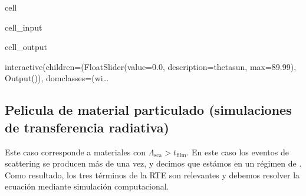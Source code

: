 \documentclass[letterpaper,10pt,english]{jupyterBook}
\begin{document}
\begin{sphinxuseclass}{cell}\begin{sphinxVerbatimInput}

\begin{sphinxuseclass}{cell_input}
\begin{sphinxVerbatim}[commandchars=\\\{\}]

 
     
\end{sphinxVerbatim}

\end{sphinxuseclass}\end{sphinxVerbatimInput}
\begin{sphinxVerbatimOutput}

\begin{sphinxuseclass}{cell_output}
\begin{sphinxVerbatim}[commandchars=\\\{\}]
interactive(children=(FloatSlider(value=0.0, description=\PYGZsq{}theta\PYGZus{}sun\PYGZsq{}, max=89.99), Output()), \PYGZus{}dom\PYGZus{}classes=(\PYGZsq{}wi…
\end{sphinxVerbatim}

\end{sphinxuseclass}\end{sphinxVerbatimOutput}

\end{sphinxuseclass}

\subsection{Pelicula de material particulado (simulaciones de transferencia radiativa)}
\label{\detokenize{5_TransporteRadiativo/5_TransporteRadiativo:pelicula-de-material-particulado-simulaciones-de-transferencia-radiativa}}
\sphinxAtStartPar
Este caso corresponde a materiales con \(\Lambda_\mathrm{sca} > t_\mathrm{film}\). En este caso los eventos de scattering se producen más de una vez, y decimos que estámos en un régimen de . Como resultado, los tres términos de la RTE son relevantes y debemos resolver la ecuación mediante simulación computacional.
\end{document}
